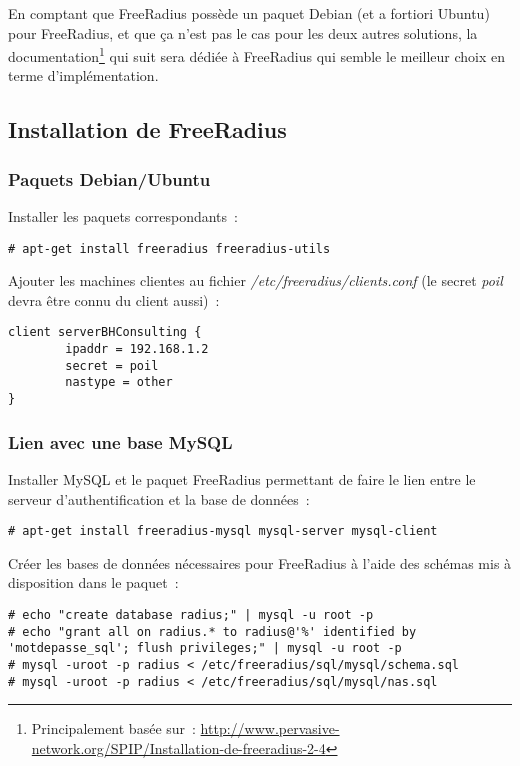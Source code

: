 En comptant que FreeRadius possède un paquet Debian (et a fortiori Ubuntu) pour FreeRadius, et que ça n'est pas le cas pour les deux autres solutions, la documentation\footnote{Principalement basée sur~: \url{http://www.pervasive-network.org/SPIP/Installation-de-freeradius-2-4}} qui suit sera dédiée à FreeRadius qui semble le meilleur choix en terme d'implémentation.

\subsection{Installation de FreeRadius}
\subsubsection{Paquets Debian/Ubuntu}

Installer les paquets correspondants~:
\begin{verbatim}
# apt-get install freeradius freeradius-utils
\end{verbatim}

Ajouter les machines clientes au fichier \emph{/etc/freeradius/clients.conf} (le secret \emph{poil} devra être connu du client aussi)~:
\begin{verbatim}
client serverBHConsulting {
        ipaddr = 192.168.1.2
        secret = poil
        nastype = other
}
\end{verbatim}

\subsubsection{Lien avec une base MySQL}

Installer MySQL et le paquet FreeRadius permettant de faire le lien entre le serveur d'authentification et la base de données~:
\begin{verbatim}
# apt-get install freeradius-mysql mysql-server mysql-client
\end{verbatim}

Créer les bases de données nécessaires pour FreeRadius à l'aide des schémas mis à disposition dans le paquet~:
\begin{verbatim}
# echo "create database radius;" | mysql -u root -p
# echo "grant all on radius.* to radius@'%' identified by 'motdepasse_sql'; flush privileges;" | mysql -u root -p
# mysql -uroot -p radius < /etc/freeradius/sql/mysql/schema.sql
# mysql -uroot -p radius < /etc/freeradius/sql/mysql/nas.sql
\end{verbatim}

